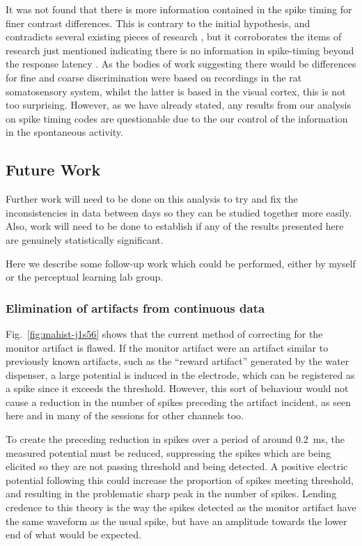 It was not found that there is more information contained in the spike timing for finer contrast differences.
This is contrary to the initial hypothesis, and contradicts several existing pieces of research \citep{Reich2001,Arabzadeh2006}, but it corroborates the items of research just mentioned indicating there is no information in spike-timing beyond the response latency \citep{Reich2001,Tovee1993,Rolls2011}.
As the bodies of work suggesting there would be differences for fine and coarse discrimination were based on recordings in the rat somatosensory system, whilst the latter is based in the visual cortex, this is not too surprising.
However, as we have already stated, any results from our analysis on spike timing codes are questionable due to the our control of the information in the spontaneous activity.

\subsection{Future Work}

Further work will need to be done on this analysis to try and fix the inconsistencies in data between days so they can be studied together more easily.
Also, work will need to be done to establish if any of the results presented here are genuinely statistically significant.

Here we describe some follow-up work which could be performed, either by myself or the perceptual learning lab group.

\subsubsection{Elimination of artifacts from continuous data}

Fig.~\ref{fig:mahist-j1s56} shows that the current method of correcting for the monitor artifact is flawed.
If the monitor artifact were an artifact similar to previously known artifacts, such as the ``reward artifact'' generated by the water dispenser, a large potential is induced in the electrode, which can be registered as a spike since it exceeds the threshold.
However, this sort of behaviour would not cause a reduction in the number of spikes preceding the artifact incident, as seen here and in many of the sessions for other channels too.

To create the preceding reduction in spikes over a period of around \SI{0.2}{ms}, the measured potential must be reduced, suppressing the spikes which are being elicited so they are not passing threshold and being detected.
A positive electric potential following this could increase the proportion of spikes meeting threshold, and resulting in the problematic sharp peak in the number of spikes.
Lending credence to this theory is the way the spikes detected as the monitor artifact have the same waveform as the usual spike, but have an amplitude towards the lower end of what would be expected.

